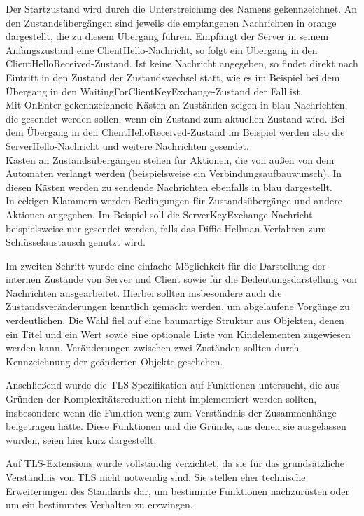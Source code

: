 Der Startzustand wird durch die Unterstreichung des Namens gekennzeichnet. An den Zustandsübergängen sind jeweils die empfangenen Nachrichten in orange dargestellt, die zu diesem Übergang führen. Empfängt der Server in seinem Anfangszustand eine ClientHello-Nachricht, so folgt ein Übergang in den ClientHelloReceived-Zustand. Ist keine Nachricht angegeben, so findet direkt nach Eintritt in den Zustand der Zustandswechsel statt, wie es im Beispiel bei dem Übergang in den WaitingForClientKeyExchange-Zustand der Fall ist.\\
Mit OnEnter gekennzeichnete Kästen an Zuständen zeigen in blau Nachrichten, die gesendet werden sollen, wenn ein Zustand zum aktuellen Zustand wird. Bei dem Übergang in den ClientHelloReceived-Zustand im Beispiel werden also die ServerHello-Nachricht und weitere Nachrichten gesendet.\\
Kästen an Zustandsübergängen stehen für Aktionen, die von außen von dem Automaten verlangt werden (beispielsweise ein Verbindungsaufbauwunsch). In diesen Kästen werden zu sendende Nachrichten ebenfalls in blau dargestellt.\\
In eckigen Klammern werden Bedingungen für Zustandsübergänge und andere Aktionen angegeben. Im Beispiel soll die ServerKeyExchange-Nachricht beispielsweise nur gesendet werden, falls das Diffie-Hellman-Verfahren zum Schlüsselaustausch genutzt wird.

Im zweiten Schritt wurde eine einfache Möglichkeit für die Darstellung der internen Zustände von Server und Client sowie für die Bedeutungsdarstellung von Nachrichten ausgearbeitet. Hierbei sollten insbesondere auch die Zustandsveränderungen kenntlich gemacht werden, um abgelaufene Vorgänge zu verdeutlichen. Die Wahl fiel auf eine baumartige Struktur aus Objekten, denen ein Titel und ein Wert sowie eine optionale Liste von Kindelementen zugewiesen werden kann. Veränderungen zwischen zwei Zuständen sollten durch Kennzeichnung der geänderten Objekte geschehen.


Anschließend wurde die TLS-Spezifikation auf Funktionen untersucht, die aus Gründen der Komplexitätsreduktion nicht implementiert werden sollten, insbesondere wenn die Funktion wenig zum Verständnis der Zusammenhänge beigetragen hätte. Diese Funktionen und die Gründe, aus denen sie ausgelassen wurden, seien hier kurz dargestellt.

Auf TLS-Extensions wurde vollständig verzichtet, da sie für das grundsätzliche Verständnis von TLS nicht notwendig sind. Sie stellen eher technische Erweiterungen des Standards dar, um bestimmte Funktionen nachzurüsten oder um ein bestimmtes Verhalten zu erzwingen.

